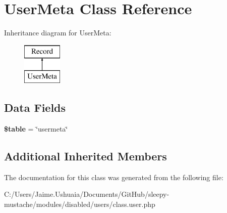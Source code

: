\hypertarget{class_user_meta}{\section{User\-Meta Class Reference}
\label{class_user_meta}
}
Inheritance diagram for User\-Meta\-:\begin{figure}[H]
\begin{center}
\leavevmode
\includegraphics[height=2.000000cm]{class_user_meta}
\end{center}
\end{figure}
\subsection*{Data Fields}
\begin{DoxyCompactItemize}
\item 
\hypertarget{class_user_meta_ae8876a14058f368335baccf35af4a22b}{{\bfseries \$table} = \char`\"{}usermeta\char`\"{}}\label{class_user_meta_ae8876a14058f368335baccf35af4a22b}

\end{DoxyCompactItemize}
\subsection*{Additional Inherited Members}


The documentation for this class was generated from the following file\-:\begin{DoxyCompactItemize}
\item 
C\-:/\-Users/\-Jaime.\-Ushuaia/\-Documents/\-Git\-Hub/sleepy-\/mustache/modules/disabled/users/class.\-user.\-php\end{DoxyCompactItemize}
